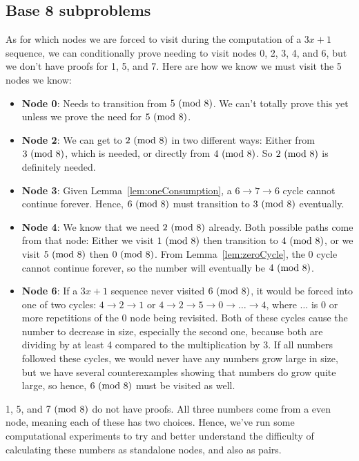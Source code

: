 \subsection{Base 8 subproblems} \label{subsubsec:base8subprob}
As for which nodes we are forced to visit during the computation of a $3x+1$ sequence, we can conditionally prove needing to visit nodes 0, 2, 3, 4, and 6, but we don't have proofs for 1, 5, and 7. Here are how we know we must visit the 5 nodes we know:


\begin{itemize}
    \item \textbf{Node 0}: Needs to transition from $5\ (\mathrm{mod}\ 8)$. We can't totally prove this yet unless we prove the need for $5\ (\mathrm{mod}\ 8)$.
    \item \textbf{Node 2}: We can get to $2\ (\mathrm{mod}\ 8)$ in two different ways: Either from $3\ (\mathrm{mod}\ 8)$, which is needed, or directly from $4\ (\mathrm{mod}\ 8)$. So $2 \ (\mathrm{mod}\ 8)$ is definitely needed. 
    \item \textbf{Node 3}: Given Lemma~\ref{lem:oneConsumption}, a $6 \rightarrow 7 \rightarrow 6$ cycle cannot continue forever. Hence, $6\ (\mathrm{mod}\ 8)$ must transition to $3\ (\mathrm{mod}\ 8)$ eventually.
    \item \textbf{Node 4}: We know that we need $2\ (\mathrm{mod}\ 8)$ already. Both possible paths come from that node: Either we visit $1\ (\mathrm{mod}\ 8)$ then transition to $4\ (\mathrm{mod}\ 8)$, or we visit $5\ (\mathrm{mod}\ 8)$ then $0\ (\mathrm{mod}\ 8)$. From Lemma~\ref{lem:zeroCycle}, the 0 cycle cannot continue forever, so the number will eventually be $4\ (\mathrm{mod}\ 8)$.
    \item \textbf{Node 6}: If a $3x+1$ sequence never visited $6\ (\mathrm{mod}\ 8)$, it would be forced into one of two cycles: $4 \rightarrow 2 \rightarrow 1$ or $4 \rightarrow 2 \rightarrow 5 \rightarrow 0 \rightarrow \ldots \rightarrow 4$, where $\ldots$ is 0 or more repetitions of the 0 node being revisited. Both of these cycles cause the number to decrease in size, especially the second one, because both are dividing by at least 4 compared to the multiplication by 3. If all numbers followed these cycles, we would never have any numbers grow large in size, but we have several counterexamples showing that numbers do grow quite large, so hence, $6\ (\mathrm{mod}\ 8)$ must be visited as well.
   
\end{itemize}
1, 5, and $7\ (\mathrm{mod}\ 8)$ do not have proofs. All three numbers come from a even node, meaning each of these has two choices. Hence, we've run some computational experiments to try and better understand the difficulty of calculating these numbers as standalone nodes, and also as pairs. 
